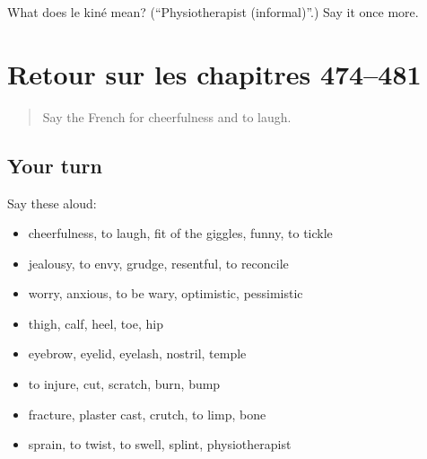 \begin{tcolorbox}[breakable,colback=teal!4,colframe=teal!35!black,title={Before you move on}]
What does le kiné mean? (\textquotedblleft{}Physiotherapist (informal)\textquotedblright{}.) Say it once more.
\end{tcolorbox}
\section[(dialogue)]{Retour sur les chapitres 474–481}

\label{lesson:FR-R481-revision-474-481}



\begin{quote}
Say the French for cheerfulness and to laugh.
\end{quote}

\subsection*{Your turn}
Say these aloud:

\begin{itemize}
\raggedright
  \item cheerfulness, to laugh, fit of the giggles, funny, to tickle
  \item jealousy, to envy, grudge, resentful, to reconcile
  \item worry, anxious, to be wary, optimistic, pessimistic
  \item thigh, calf, heel, toe, hip
  \item eyebrow, eyelid, eyelash, nostril, temple
  \item to injure, cut, scratch, burn, bump
  \item fracture, plaster cast, crutch, to limp, bone
  \item sprain, to twist, to swell, splint, physiotherapist
\end{itemize}

